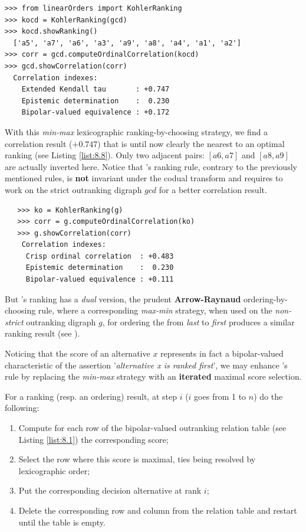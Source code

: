 \begin{lstlisting}[caption={Computing a \Kohler ranking},label=list:8.13]   
>>> from linearOrders import KohlerRanking
>>> kocd = KohlerRanking(gcd)
>>> kocd.showRanking()
  ['a5', 'a7', 'a6', 'a3', 'a9', 'a8', 'a4', 'a1', 'a2']
>>> corr = gcd.computeOrdinalCorrelation(kocd)
>>> gcd.showCorrelation(corr)
  Correlation indexes:
    Extended Kendall tau       : +0.747
    Epistemic determination    :  0.230
    Bipolar-valued equivalence : +0.172
\end{lstlisting}

With this \emph{min-max} lexicographic ranking-by-choosing strategy, we find a correlation result ($+0.747$) that is until now clearly the nearest to an optimal \Kemeny ranking (see Listing \ref{list:8.8}). Only two adjacent pairs: $[a6, a7]$ and $[a8, a9]$ are actually inverted here. Notice that \Kohler 's ranking rule, contrary to the previously mentioned rules, is \textbf{not} invariant under the codual transform and requires to work on the strict outranking digraph $gcd$ for a better correlation result.

\begin{lstlisting}
   >>> ko = KohlerRanking(g)  
   >>> corr = g.computeOrdinalCorrelation(ko)
   >>> g.showCorrelation(corr)
    Correlation indexes:
     Crisp ordinal correlation  : +0.483
     Epistemic determination    :  0.230
     Bipolar-valued equivalence : +0.111
\end{lstlisting}

But \Kohler 's ranking has a \emph{dual} version, the prudent \textbf{Arrow-Raynaud} ordering-by-choosing rule, where a corresponding \emph{max-min} strategy, when used on the \emph{non-strict} outranking digraph $g$, for ordering the from \emph{last} to \emph{first} produces a similar ranking result (see \citep{LAM-2009,DIA-2010}).

Noticing that the \NetFlows score of an alternative $x$ represents in fact a bipolar-valued characteristic of the assertion '\emph{alternative x is ranked first}', we may enhance \Kohler 's rule by replacing the \emph{min-max} strategy with an \textbf{iterated} maximal \NetFlows score selection.

For a ranking (resp. an ordering) result, at step $i$ ($i$ goes from 1 to $n$) do the following:
\begin{enumerate}
\item Compute for each row of the bipolar-valued outranking relation table (see Listing \ref{list:8.1}) the corresponding \NetFlows score;
\item Select the row where this score is maximal, ties being resolved by lexicographic order;
\item Put the corresponding decision alternative at rank $i$;
\item Delete the corresponding row and column from the relation table and restart until the table is empty.
\end{enumerate}

